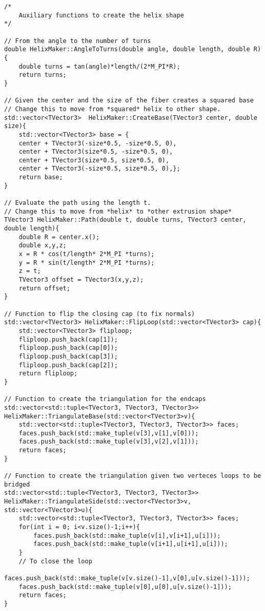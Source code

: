 \begin{lstlisting}
/*
    Auxiliary functions to create the helix shape
*/

// From the angle to the number of turns
double HelixMaker::AngleToTurns(double angle, double length, double R){
    double turns = tan(angle)*length/(2*M_PI*R);
    return turns;
}

// Given the center and the size of the fiber creates a squared base
// Change this to move from *squared* helix to other shape.
std::vector<TVector3>  HelixMaker::CreateBase(TVector3 center, double size){
    std::vector<TVector3> base = {
    center + TVector3(-size*0.5, -size*0.5, 0),
    center + TVector3(size*0.5, -size*0.5, 0),
    center + TVector3(size*0.5, size*0.5, 0),
    center + TVector3(-size*0.5, size*0.5, 0),};
    return base;
}

// Evaluate the path using the length t. 
// Change this to move from *helix* to *other extrusion shape*
TVector3 HelixMaker::Path(double t, double turns, TVector3 center, double length){
    double R = center.x();
    double x,y,z;
    x = R * cos(t/length* 2*M_PI *turns);
    y = R * sin(t/length* 2*M_PI *turns);
    z = t;
    TVector3 offset = TVector3(x,y,z);
    return offset;
}

// Function to flip the closing cap (to fix normals)
std::vector<TVector3> HelixMaker::FlipLoop(std::vector<TVector3> cap){
    std::vector<TVector3> fliploop;
    fliploop.push_back(cap[1]);
    fliploop.push_back(cap[0]);
    fliploop.push_back(cap[3]);
    fliploop.push_back(cap[2]);
    return fliploop;
}

// Function to create the triangulation for the endcaps
std::vector<std::tuple<TVector3, TVector3, TVector3>> HelixMaker::TriangulateBase(std::vector<TVector3>v){
    std::vector<std::tuple<TVector3, TVector3, TVector3>> faces;
    faces.push_back(std::make_tuple(v[3],v[1],v[0]));
    faces.push_back(std::make_tuple(v[3],v[2],v[1]));
    return faces;
}

// Function to create the triangulation given two verteces loops to be bridged
std::vector<std::tuple<TVector3, TVector3, TVector3>> HelixMaker::TriangulateSide(std::vector<TVector3>v, std::vector<TVector3>u){
    std::vector<std::tuple<TVector3, TVector3, TVector3>> faces;
    for(int i = 0; i<v.size()-1;i++){
        faces.push_back(std::make_tuple(v[i],v[i+1],u[i]));
        faces.push_back(std::make_tuple(v[i+1],u[i+1],u[i]));
    }
    // To close the loop
    faces.push_back(std::make_tuple(v[v.size()-1],v[0],u[v.size()-1]));
    faces.push_back(std::make_tuple(v[0],u[0],u[v.size()-1]));
    return faces;
}


\end{lstlisting}
